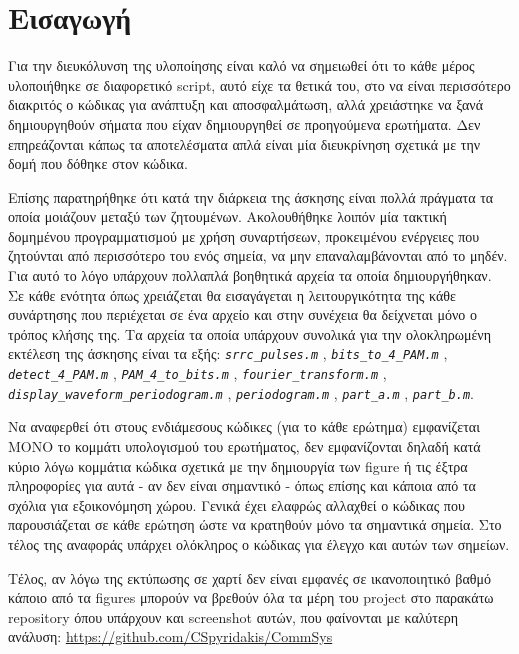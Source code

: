 \documentclass[11pt]{article}
\begin{document}
    \section*{Εισαγωγή}
    Για την διευκόλυνση της υλοποίησης είναι καλό να σημειωθεί ότι το κάθε μέρος υλοποιήθηκε σε διαφορετικό script, αυτό είχε τα θετικά του, στο να είναι περισσότερο διακριτός ο κώδικας για ανάπτυξη και αποσφαλμάτωση, αλλά χρειάστηκε να ξανά δημιουργηθούν σήματα που είχαν δημιουργηθεί σε προηγούμενα ερωτήματα. Δεν επηρεάζονται κάπως τα αποτελέσματα απλά είναι μία διευκρίνηση σχετικά με την δομή που δόθηκε στον κώδικα. 
    \par \noindent
    Επίσης παρατηρήθηκε ότι κατά την διάρκεια της άσκησης είναι πολλά πράγματα τα οποία μοιάζουν μεταξύ των ζητουμένων. Ακολουθήθηκε λοιπόν μία τακτική δομημένου προγραμματισμού με χρήση συναρτήσεων, προκειμένου ενέργειες που ζητούνται από περισσότερο του ενός σημεία, να μην επαναλαμβάνονται από το μηδέν. Για αυτό το λόγο υπάρχουν πολλαπλά βοηθητικά αρχεία τα οποία δημιουργήθηκαν. Σε κάθε ενότητα όπως χρειάζεται θα εισαγάγεται η λειτουργικότητα της κάθε συνάρτησης που περιέχεται σε ένα αρχείο και στην συνέχεια θα δείχνεται μόνο ο τρόπος κλήσης της. Τα αρχεία τα οποία υπάρχουν συνολικά για την ολοκληρωμένη εκτέλεση της άσκησης είναι τα εξής: \emph{\texttt{srrc\_pulses.m}} , \emph{\texttt{bits\_to\_4\_PAM.m}} , \emph{\texttt{detect\_4\_PAM.m}} , \emph{\texttt{PAM\_4\_to\_bits.m}} , \emph{\texttt{fourier\_transform.m}} ,  \emph{\texttt{display\_waveform\_periodogram.m}} , \emph{\texttt{periodogram.m}} , \emph{\texttt{part\_a.m}} , \emph{\texttt{part\_b.m}}.
    \par \noindent
    Να αναφερθεί ότι στους ενδιάμεσους κώδικες (για το κάθε ερώτημα) εμφανίζεται ΜΟΝΟ το κομμάτι υπολογισμού του ερωτήματος, δεν εμφανίζονται δηλαδή κατά κύριο λόγω κομμάτια κώδικα σχετικά με την δημιουργία των figure ή τις έξτρα πληροφορίες για αυτά - αν δεν είναι σημαντικό - όπως επίσης και κάποια από τα σχόλια για εξοικονόμηση χώρου. Γενικά έχει ελαφρώς αλλαχθεί ο κώδικας που παρουσιάζεται σε κάθε ερώτηση ώστε να κρατηθούν μόνο τα σημαντικά σημεία. Στο τέλος της αναφοράς υπάρχει ολόκληρος ο κώδικας για έλεγχο και αυτών των σημείων.
    \par \noindent
    Τέλος, αν λόγω της εκτύπωσης σε χαρτί δεν είναι εμφανές σε ικανοποιητικό βαθμό κάποιο από τα figures μπορούν να βρεθούν όλα τα μέρη του project στο παρακάτω repository όπου υπάρχουν και screenshot αυτών, που φαίνονται με καλύτερη ανάλυση: \url{https://github.com/CSpyridakis/CommSys}
\end{document}
